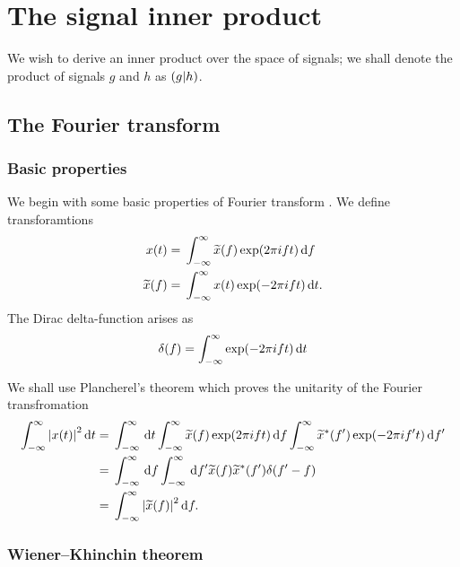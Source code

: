 \chapter{The signal inner product}

We wish to derive an inner product over the space of signals; we shall denote the product of signals $g$ and $h$ as $\left({g}\middle|{h}\right)$.

\section{The Fourier transform}

\subsection{Basic properties}

We begin with some basic properties of Fourier transform \citep{Riley2002}. We define transforamtions
\begin{subequations}
\begin{align}
x(t) = {} & \int_{-\infty}^{\infty}{\widetilde{x}(f)\exp(2\pi ift)}\,\mathrm{d}{f} \\
\widetilde{x}(f) = {} & \int_{-\infty}^{\infty}{x(t)\exp(-2\pi ift)}\,\mathrm{d}{t}.
\end{align}
\end{subequations}
The Dirac delta-function arises as
\begin{equation}
\delta(f) = \int_{-\infty}^{\infty}{\exp(-2\pi ift)}\,\mathrm{d}{t}
\end{equation}

We shall use Plancherel's theorem which proves the unitarity of the Fourier transfromation
\begin{align}
\int_{-\infty}^{\infty}{\left|x(t)\right|^2}\,\mathrm{d}{t} = {} & \int_{-\infty}^\infty\,\mathrm{d} t \int_{-\infty}^{\infty}{\widetilde{x}(f)\exp(2\pi ift)}\,\mathrm{d}{f} \int_{-\infty}^{\infty}{\widetilde{x}^\ast(f')\exp(-2\pi if't)}\,\mathrm{d}{f'} \nonumber \\
 = {} & \int_{-\infty}^\infty\,\mathrm{d} f \int_{-\infty}^\infty\,\mathrm{d} f' \widetilde{x}(f) \widetilde{x}^\ast(f') \delta(f' - f) \nonumber \\
 = {} & \int_{-\infty}^{\infty}{\left|\widetilde{x}(f)\right|^2}\,\mathrm{d}{f}.
\end{align}

\subsection{Wiener--Khinchin theorem}

